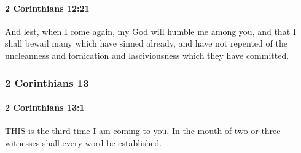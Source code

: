 		\paragraph{2 Corinthians 12:21} %
			\label{2CORINTHIANS-12-21}

			And lest, when I come again, my God will humble me among you, and that I shall bewail many which have sinned already, and have not repented of the uncleanness and fornication and lasciviousness which they have committed.

			\begin{framed}
			\scriptsize
				\begin{compactdesc}
					\item[SBLG] 
				\end{compactdesc}
			\end{framed}

	\subsubsection{2 Corinthians 13} %
		\label{2CORINTHIANS-13}
		
		\paragraph{2 Corinthians 13:1} %
			\label{2CORINTHIANS-13-1}

			THIS is the third time I am coming to you.  In the mouth of two or three witnesses shall every word be established.

